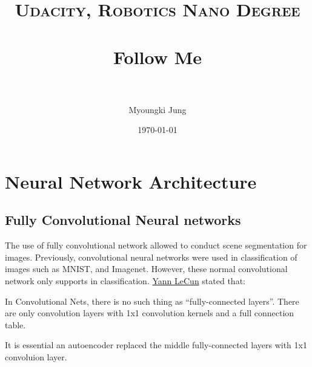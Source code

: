 \documentclass[paper=a4, fontsize=11pt]{scrartcl} %
\title{	
\normalfont \normalsize 
\textsc{Udacity, Robotics Nano Degree} \\ [25pt] %
\horrule{0.5pt} \\[0.4cm] %
\huge Follow Me \\ %
\horrule{2pt} \\[0.5cm] %
}
\author{Myoungki Jung} %
\date{\normalsize\today} %
\numberwithin{equation}{section} %
\numberwithin{figure}{section} %
\numberwithin{table}{section} %
\begin{document}
\maketitle %

\section{Neural Network Architecture}

\subsection{Fully Convolutional Neural networks}

The use of fully convolutional network allowed to conduct scene segmentation for images. 
Previously, convolutional neural networks were used in classification of images such as MNIST, and Imagenet. However, these normal convolutional network only supports in classification.
\href{https://www.facebook.com/yann.lecun/posts/10152820758292143}{Yann LeCun} stated that:

\begin{displayquote}
	In Convolutional Nets, there is no such thing as “fully-connected layers”. There are only convolution layers with 1x1 convolution kernels and a full connection table.
\end{displayquote}

It is essential an autoencoder replaced the middle fully-connected layers with 1x1 convoluion layer.
\end{document}
